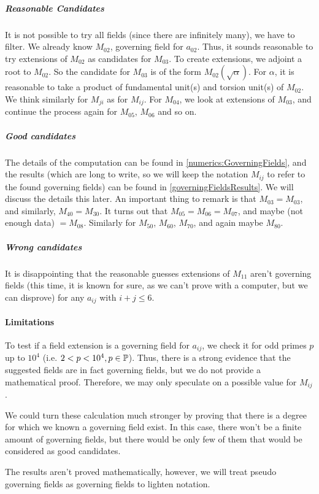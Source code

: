\subparagraph{Reasonable Candidates}
It is not possible to try all fields (since there are infinitely many), we have to filter.
We already know $M_{02}$, governing field for $a_{02}$.
Thus, it sounds reasonable to try extensions of $M_{02}$ as candidates for $M_{03}$.
To create extensions, we adjoint a root to $M_{02}$.
So the candidate for $M_{03}$ is of the form $M_{02}\left( \sqrt{\alpha} \right)$.
For $\alpha$, it is reasonable to take a product of fundamental unit(s) and torsion unit(s) of $M_{02}$.
We think similarly for $M_{ji}$ as for $M_{ij}$.
For $M_{04}$, we look at extensions of $M_{03}$, and continue the process again for $M_{05}$, $M_{06}$ and so on.

\subparagraph{Good candidates}
The details of the computation can be found in \ref{numerics:GoverningFields}, and the results (which are long to write, so we will keep the notation $M_{ij}$ to refer to the found governing fields) can be found in \ref{governingFieldsResults}.
We will discuss the details this later.
An important thing to remark is that $M_{03} = M_{03}$, and similarly, $M_{40} = M_{30}$.
It turns out that $M_{05} = M_{06} = M_{07}$, and maybe (not enough data) $ = M_{08}$.
Similarly for $M_{50}$, $M_{60}$, $M_{70}$, and again maybe $M_{80}$.

\subparagraph{Wrong candidates}
It is disappointing that the reasonable guesses extensions of $M_{11}$ aren't governing fields (this time, it is known for sure, as we can't prove with a computer, but we can disprove) for any $a_{ij}$ with $i+j \leq 6$.

\paragraph{Limitations}
To test if a field extension is a governing field for $a_{ij}$, we check it for odd primes $p$ up to $10^4$ (i.e. $2 < p <10^4, p \in \mathbb{P}$).
Thus, there is a strong evidence that the suggested fields are in fact governing fields, but we do not provide a mathematical proof.
Therefore, we may only speculate on a possible value for $M_{ij}$.

We could turn these calculation much stronger by proving that there is a degree for which we known a governing field exist.
In this case, there won't be a finite amount of governing fields, but there would be only few of them that would be considered as good candidates.

The results aren't proved mathematically, however, we will treat pseudo governing fields as governing fields to lighten notation.


